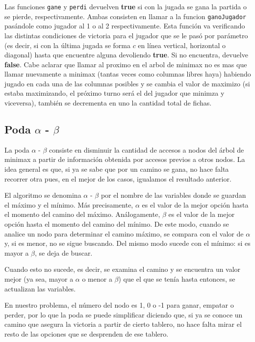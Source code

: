 \documentclass[A4paper,oneside,fleqn,11pt]{article}
\theoremstyle{definition}
\begin{document}
Las funciones \texttt{gane} y \texttt{perdi} devuelven \textbf{true} si con la jugada se gana la partida o se pierde, respectivamente. Ambas consisten en llamar a la funcion \texttt{ganoJugador} pasándole como jugador al 1 o al 2 respectivamente. Esta función va verificando las distintas condiciones de victoria para el jugador que se le pasó por parámetro (es decir, si con la última jugada se forma $c$ en línea vertical, horizontal o diagonal) hasta que encuentre alguna devoliendo \textbf{true}. Si no encuentra, devuelve \textbf{false}. Cabe aclarar que llamar al proximo en el arbol de minimax no es mas que llamar nuevamente a minimax (tantas veces como columnas libres haya) habiendo jugado en cada una de las columnas posibles y se cambia el valor de maximizo (si estaba maximizando, el próximo turno será el del jugador que minimza y viceversa), también se decrementa en uno la cantidad total de fichas.



\subsection{Poda $\alpha$ - $\beta$}

La poda $\alpha$ - $\beta$ consiste en disminuir la cantidad de accesos a nodos del árbol de minimax a partir de información obtenida por accesos previos a otros nodos. La idea general es que, si ya se sabe que por un camino se gana, no hace falta recorrer otra pues, en el mejor de los casos, igualamos el resultado anterior.

El algoritmo se denomina $\alpha$ - $\beta$ por el nombre de las variables donde se guardan el máximo y el mínimo. Más precisamente, $\alpha$ es el valor de la mejor opción hasta el momento del camino del máximo. Análogamente, $\beta$ es el valor de la mejor opción hasta el momento del camino del mínimo. De este modo, cuando se analice un nodo para determinar el camino máximo, se compara con el valor de $\alpha$ y, si es menor, no se sigue buscando. Del mismo modo sucede con el mínimo: si es mayor a $\beta$, se deja de buscar.

Cuando esto no sucede, es decir, se examina el camino y se encuentra un valor mejor (ya sea, mayor a $\alpha$ o menor a $\beta$) que el que se tenía hasta entonces, se actualizan las variables.

En nuestro problema, el número del nodo es 1, 0 o -1 para ganar, empatar o perder, por lo que la poda se puede simplificar diciendo que, si ya se conoce un camino que asegura la victoria a partir de cierto tablero, no hace falta mirar el resto de las opciones que se desprenden de ese tablero.
\end{document}
